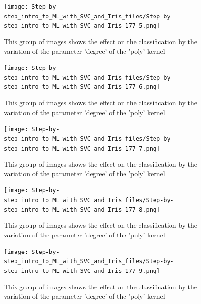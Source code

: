 \documentclass [oneside,10pt,a4paper,ngerman,BCOR10mm,headsepline,parindent,final]{scrartcl}
\begin{document}
    \begin{figure}
        \begin{center}\texttt{[image: Step-by-step\_intro\_to\_ML\_with\_SVC\_and\_Iris\_files/Step-by-step\_intro\_to\_ML\_with\_SVC\_and\_Iris\_177\_5.png]}\end{center}
        \caption{This group of images shows the effect on the classification by the variation of the parameter 'degree' of the 'poly' kernel}
        \label{fig:vary_degree_parameter}
    \end{figure}
    
    \begin{figure}
        \begin{center}\texttt{[image: Step-by-step\_intro\_to\_ML\_with\_SVC\_and\_Iris\_files/Step-by-step\_intro\_to\_ML\_with\_SVC\_and\_Iris\_177\_6.png]}\end{center}
        \caption{This group of images shows the effect on the classification by the variation of the parameter 'degree' of the 'poly' kernel}
        \label{fig:vary_degree_parameter}
    \end{figure}
    
    \begin{figure}
        \begin{center}\texttt{[image: Step-by-step\_intro\_to\_ML\_with\_SVC\_and\_Iris\_files/Step-by-step\_intro\_to\_ML\_with\_SVC\_and\_Iris\_177\_7.png]}\end{center}
        \caption{This group of images shows the effect on the classification by the variation of the parameter 'degree' of the 'poly' kernel}
        \label{fig:vary_degree_parameter}
    \end{figure}
    
    \begin{figure}
        \begin{center}\texttt{[image: Step-by-step\_intro\_to\_ML\_with\_SVC\_and\_Iris\_files/Step-by-step\_intro\_to\_ML\_with\_SVC\_and\_Iris\_177\_8.png]}\end{center}
        \caption{This group of images shows the effect on the classification by the variation of the parameter 'degree' of the 'poly' kernel}
        \label{fig:vary_degree_parameter}
    \end{figure}
    
    \begin{figure}
        \begin{center}\texttt{[image: Step-by-step\_intro\_to\_ML\_with\_SVC\_and\_Iris\_files/Step-by-step\_intro\_to\_ML\_with\_SVC\_and\_Iris\_177\_9.png]}\end{center}
        \caption{This group of images shows the effect on the classification by the variation of the parameter 'degree' of the 'poly' kernel}
        \label{fig:vary_degree_parameter}
    \end{figure}
    
\end{document}
